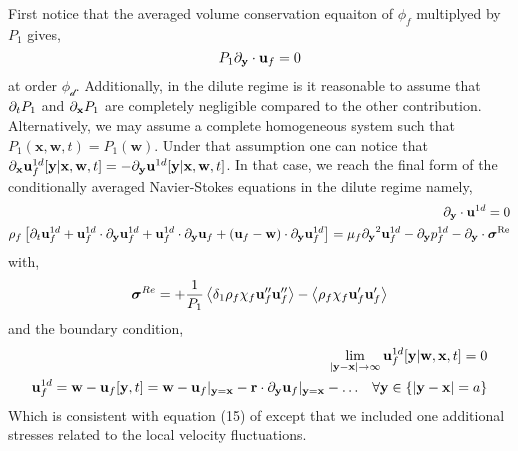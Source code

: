 First notice that the averaged volume conservation equaiton of $\phi_f$ multiplyed by $P_1$ gives, 
\begin{equation*}
    P_1{\partial_\textbf{y}} \cdot \textbf{u}_f = 0
\end{equation*}
at order $\mathcal{\phi_d}$. 
Additionally, in the dilute regime is it reasonable to assume that $\partial_t P_1$ and ${\partial_\textbf{x}} P_1$ are completely negligible compared to the other contribution. 
Alternatively, we may assume a complete homogeneous system such that $P_1(\textbf{x},\textbf{w},t) = P_1(\textbf{w})$. 
Under that assumption one can notice that ${\partial_\textbf{x}} \textbf{u}_f^{1d}[\textbf{y}|\textbf{x},\textbf{w},t] = - {\partial_\textbf{y}} \textbf{u}^{1d}[\textbf{y}|\textbf{x},\textbf{w},t]$. 
In that case, we reach the final form of the conditionally averaged Navier-Stokes equations in the dilute regime  namely, 
\begin{align*}
    {\partial_\textbf{y}} \cdot \textbf{u}^{1d} = 0 \\
    \rho_f \left[
        \partial_t \textbf{u}_f^{1d}
        +  \textbf{u}^{1d}_f\cdot {\partial_\textbf{y}}\textbf{u}_f^{1d} 
        +  \textbf{u}^{1d}_f\cdot {\partial_\textbf{y}}\textbf{u}_f 
        +  (\textbf{u}_f - \textbf{w})\cdot {\partial_\textbf{y}}\textbf{u}_f^{1d}
    \right]
    =
        \mu_f {\partial_\textbf{y}}^2 \textbf{u}^{1d}_f  
        - {\partial_\textbf{y}} p_f^{1d} 
    - {\partial_\textbf{y}} \cdot \bm\sigma^\text{Re}
\end{align*}
with, 
\begin{equation*}
    \bm\sigma^{Re}
    = 
    + \frac{1}{P_1}\left<\delta_1\rho_f\chi_f\textbf{u}_f''\textbf{u}_f''\right>
    - \left<\rho_f\chi_f\textbf{u}_f'\textbf{u}_f'\right>
\end{equation*}
and the boundary condition, 
\begin{align*}
    \lim_{|\textbf{y}-\textbf{x}|\to\infty} \textbf{u}_f^{1d}[\textbf{y}|\textbf{w},\textbf{x},t] = 0 \\
    \textbf{u}_f^{1d} = \textbf{w} - \textbf{u}_f[\textbf{y},t]
    = 
    \textbf{w} 
    - \textbf{u}_f|_{\textbf{y}=\textbf{x}}
    -\textbf{r} \cdot {\partial_\textbf{y}}\textbf{u}_f|_{\textbf{y}=\textbf{x}}
    - \ldots
    \;\;\; \forall \textbf{y} \in \{ |\textbf{y}-\textbf{x}| = a \}
     \\
\end{align*}
Which is consistent with equation (15) of \citep{maxey1983equation} except that we included one additional stresses related to the local velocity fluctuations. 

